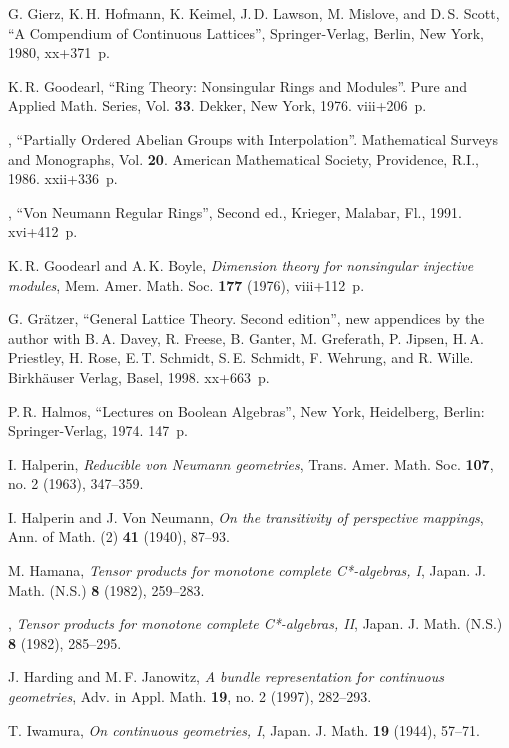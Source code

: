 \documentclass[psamsfonts,reqno]{memo-l}
\theoremstyle{plain}
\theoremstyle{definition}
\theoremstyle{remark}
\numberwithin{equation}{section}
\begin{document}
\begin{thebibliography}{99}
G. Gierz, K.\,H. Hofmann, K. Keimel, J.\,D. Lawson, M. Mislove, and
D.\,S. Scott, ``A Compendium of Continuous Lattices'',
Springer-Verlag, Berlin, New York, 1980, xx+371~p.

K.\,R. Goodearl,
``Ring Theory: Nonsingular Rings and Modules''.
Pure and Applied Math. Series, Vol. \textbf{33}. Dekker, New York,
1976. viii+206~p.

\bysame,
``Partially Ordered Abelian Groups with Interpolation''.
Mathematical Surveys and Monographs, Vol. \textbf{20}. American
Mathematical Society, Providence,  R.I., 1986. xxii+336~p.

\bysame,
``Von Neumann Regular Rings'', Second ed., Krieger, Malabar,
Fl., 1991. xvi+412~p.

K.\,R. Goodearl and A.\,K. Boyle,
\emph{Dimension theory for nonsingular injective modules},
Mem. Amer. Math. Soc. \textbf{177} (1976), viii+112~p.

G. Gr\"atzer,
``General Lattice Theory. Second edition'', new appendices by the
author with B.\,A. Davey, R. Freese, B. Ganter,
M. Greferath, P. Jipsen, H.\,A. Priestley, H. Rose, E.\,T. Schmidt,
S.\,E. Schmidt, F. Wehrung, and R. Wille. Birkh\"auser Verlag, Basel,
1998. xx+663~p.

P.\,R. Halmos,
``Lectures on Boolean Algebras'',
New York, Heidelberg, Berlin: Springer-Verlag, 1974. 147~p.

I. Halperin, \emph{Reducible von Neumann geometries}, Trans. Amer.
Math. Soc. {\bf 107}, no. 2 (1963), 347--359.

I. Halperin and J. Von Neumann,
\emph{On the transitivity of perspective mappings},
Ann. of Math. (2) \textbf{41} (1940), 87--93.

M. Hamana,
\emph{Tensor products for monotone complete C*-algebras, I},
Japan. J. Math. (N.S.) {\bf 8} (1982), 259--283.

\bysame,
\emph{Tensor products for monotone complete C*-algebras, II},
Japan. J. Math. (N.S.) {\bf 8} (1982), 285--295.

J. Harding and M.\,F. Janowitz,
\emph{A bundle representation for continuous geometries},
Adv. in Appl. Math. \textbf{19}, no. 2 (1997), 282--293.

T. Iwamura,
\emph{On continuous geometries, I},
Japan. J. Math. \textbf{19} (1944), 57--71.


\end{thebibliography}
\end{document}
